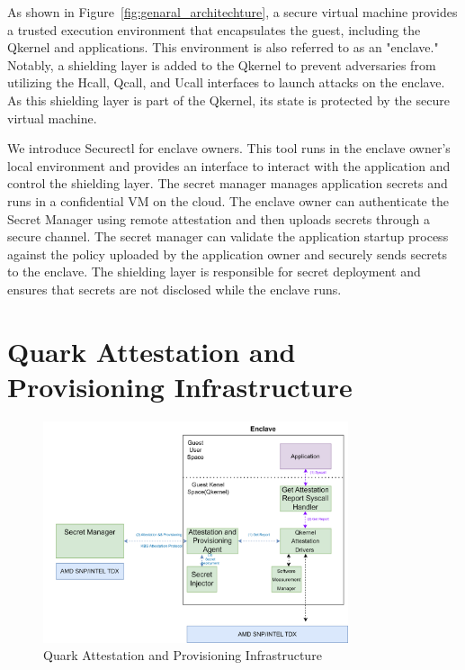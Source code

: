 As shown in Figure~\ref{fig:genaral_architechture}, a secure virtual machine provides a trusted execution environment that encapsulates the guest, including the Qkernel and applications. This environment is also referred to as an "enclave." Notably, a shielding layer is added to the Qkernel to prevent adversaries from utilizing the Hcall, Qcall, and Ucall interfaces to launch attacks 
on the enclave. As this shielding layer is part of the Qkernel, its state is protected by the secure virtual machine.

We introduce Securectl for enclave owners. This tool runs in the enclave owner's local environment and provides an interface to interact with the application and control the shielding layer. The secret manager manages application secrets and runs in a confidential VM on the cloud. The enclave owner can authenticate the Secret Manager using remote attestation 
and then uploads secrets through a secure channel. The secret manager can validate the application startup process against the policy uploaded by the application owner and securely sends secrets to the enclave. The shielding layer is responsible for secret deployment and ensures that secrets are not disclosed while the enclave runs.


\section{Quark Attestation and Provisioning Infrastructure}
\label{sec:design_Quark_Attestation_and_Provisioning_Infrastructure}

\begin{figure}[htp]
    \centering
    \includegraphics[width=0.8\textwidth]{images/Qkernel_attestation_infrastructurc.png}
    \caption[Quark Attestation and Provisioning Infrastructure]{Quark Attestation and Provisioning Infrastructure}
    \label{fig:Qkernel_attestation_infrastructurc}
\end{figure}

